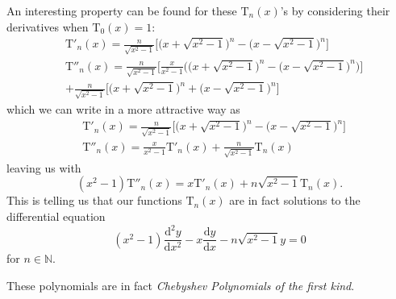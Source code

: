 \documentclass{article}
\begin{document}
An interesting property can be found for these $\mathrm{T}_n(x)$'s by considering their derivatives when $\mathrm{T}_0(x) = 1$:
\begin{align*}
& \mathrm{T}'_n(x) = \frac{n}{\sqrt{x^2-1}}\Big[\Big(x + \sqrt{x^2-1}\Big)^{n} - \Big(x - \sqrt{x^2-1}\Big)^{n}\Big] \\
& \mathrm{T}''_n(x) = \frac{n}{\sqrt{x^2-1}}\Big[\frac{x}{x^2-1}\Big(\Big(x + \sqrt{x^2-1}\Big)^{n} - \Big(x - \sqrt{x^2-1}\Big)^{n}\Big)\Big] \\
&  + \frac{n}{\sqrt{x^2-1}}\Big[\Big(x + \sqrt{x^2-1}\Big)^n + \Big(x - \sqrt{x^2-1}\Big)^n\Big]
\end{align*}
which we can write in a more attractive way as
\begin{align*}
& \mathrm{T}'_n(x) = \frac{n}{\sqrt{x^2-1}}\Big[\Big(x + \sqrt{x^2-1}\Big)^{n} - \Big(x - \sqrt{x^2-1}\Big)^{n}\Big] \\
& \mathrm{T}''_n(x) = \frac{x}{x^2-1}\mathrm{T}'_{n}(x) + \frac{n}{\sqrt{x^2-1}}\mathrm{T}_n(x)
\end{align*}
leaving us with
\begin{equation*}
(x^2-1)\mathrm{T}''_n(x) = x \mathrm{T}'_{n}(x) + n\sqrt{x^2-1}\mathrm{T}_n(x).
\end{equation*}
This is telling us that our functions $\mathrm{T}_n(x)$ are in fact solutions to the differential equation
\begin{equation*}
(x^2-1)\frac{\mathrm{d}^2y}{\mathrm{d}x^2} - x\frac{\mathrm{d}y}{\mathrm{d}x} - n\sqrt{x^2-1}y = 0
\end{equation*}
for $n \in \mathbb{N}$. \par

\quad These polynomials are in fact \textit{Chebyshev Polynomials of the first kind}.
\end{document}
